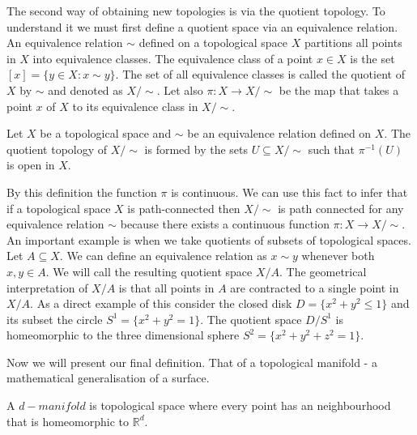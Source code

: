 The second way of obtaining new topologies is via the quotient topology. To understand it we must first define a quotient space via an equivalence relation. An equivalence relation $\sim$ defined on a topological space $X$ partitions all points in $X$ into equivalence classes. The equivalence class of a point $x \in X$ is the set $[x] = \{y \in X: x \sim y\}$. The set of all equivalence classes is called the quotient of $X$ by $\sim$ and denoted as $X / \sim$. Let also $\pi: X \to X/ \sim$ be the map that takes a point $x$ of $X$ to its equivalence class in $X / \sim$.

\begin{defn} Let $X$ be a topological space and $\sim$ be an equivalence relation defined on $X$. The quotient topology of $X / \sim$ is formed by the sets $U \subseteq X / \sim$ such that $\pi^{-1}(U)$ is open in $X$. \end{defn}

By this definition the function $\pi$ is continuous. We can use this fact to infer that if a topological space $X$ is path-connected then $X / \sim$ is path connected for any equivalence relation $\sim$ because there exists a continuous function $\pi : X \to X / \sim$. An important example is when we take quotients of subsets of topological spaces. Let $A \subseteq X$. We can define an equivalence relation as $x \sim y$ whenever both $x, y \in A$. We will call the resulting quotient space $X / A$. The geometrical interpretation of $X / A$ is that all points in $A$ are contracted to a single point in $X / A$. As a direct example of this consider the closed disk $D = \{x^2 + y^2 \le 1\}$ and its subset the circle $S^1 = \{x^2 + y^2 = 1\}$.
The quotient space $D / S^1$ is homeomorphic to the three dimensional sphere $S^2 = \{x^2 + y^2 + z^2 = 1\}$.


Now we will present our final definition. That of a topological manifold - a mathematical generalisation of a surface.

\begin{defn} A $d-manifold$ is topological space where every point has an neighbourhood that is homeomorphic to $\mathbb{R}^d$.  \end{defn}

